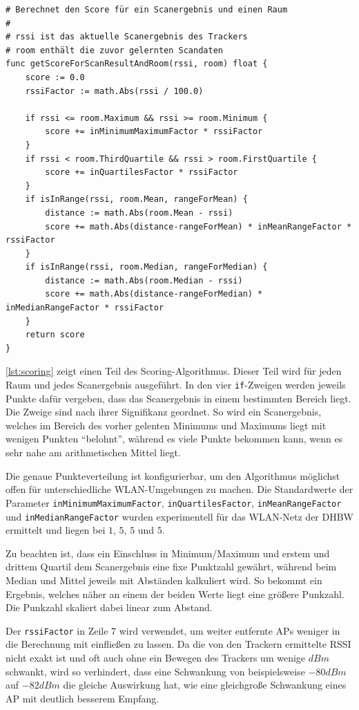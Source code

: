 \begin{lstlisting}[caption={Pseudocode-Beschreibung der Scoring-Funktion},label={lst:scoring},tabsize=2]
# Berechnet den Score für ein Scanergebnis und einen Raum
#
# rssi ist das aktuelle Scanergebnis des Trackers
# room enthält die zuvor gelernten Scandaten
func getScoreForScanResultAndRoom(rssi, room) float {
	score := 0.0
	rssiFactor := math.Abs(rssi / 100.0)

	if rssi <= room.Maximum && rssi >= room.Minimum {
		score += inMinimumMaximumFactor * rssiFactor
	}
	if rssi < room.ThirdQuartile && rssi > room.FirstQuartile {
		score += inQuartilesFactor * rssiFactor
	}
	if isInRange(rssi, room.Mean, rangeForMean) {
		distance := math.Abs(room.Mean - rssi)
		score += math.Abs(distance-rangeForMean) * inMeanRangeFactor * rssiFactor
	}
	if isInRange(rssi, room.Median, rangeForMedian) {
		distance := math.Abs(room.Median - rssi)
		score += math.Abs(distance-rangeForMedian) * inMedianRangeFactor * rssiFactor
	}
	return score
}
\end{lstlisting}

\autoref{lst:scoring} zeigt einen Teil des Scoring-Algorithmus. Dieser Teil wird für jeden Raum und
jedes Scanergebnis ausgeführt. In den vier \texttt{if}-Zweigen werden jeweils Punkte dafür vergeben,
dass das Scanergebnis in einem bestimmten Bereich liegt. Die Zweige sind nach ihrer Signifikanz
geordnet. So wird ein Scanergebnis, welches im Bereich des vorher gelenten Minimums und Maximums
liegt mit wenigen Punkten \enquote{belohnt}, während es viele Punkte bekommen kann, wenn es sehr
nahe am arithmetischen Mittel liegt.

Die genaue Punkteverteilung ist konfigurierbar, um den Algorithmus möglichst offen für
unterschiedliche \gls{WLAN}-Umgebungen zu machen. Die Standardwerte der Parameter
\texttt{inMinimumMaximumFactor}, \texttt{inQuartilesFactor}, \texttt{inMeanRangeFactor} und
\texttt{inMedianRangeFactor} wurden experimentell für das \gls{WLAN}-Netz der \gls{DHBW} ermittelt und liegen
bei $1$, $5$, $5$ und $5$.

Zu beachten ist, dass ein Einschluss in Minimum/Maximum und erstem und drittem Quartil dem
Scanergebnis eine fixe Punktzahl gewährt, während beim Median und Mittel jeweils mit Abständen
kalkuliert wird. So bekommt ein Ergebnis, welches näher an einem der beiden Werte liegt eine größere
Punkzahl. Die Punkzahl skaliert dabei linear zum Abstand.

Der \texttt{rssiFactor} in Zeile 7 wird verwendet, um weiter entfernte \glspl{AP} weniger in die
Berechnung mit einfließen zu lassen. Da die von den Trackern ermittelte \gls{RSSI} nicht exakt ist
und oft auch ohne ein Bewegen des Trackers um wenige $dBm$ schwankt, wird so verhindert, dass eine
Schwankung von beispielsweise $-80dBm$ auf $-82dBm$ die gleiche Auswirkung hat, wie eine gleichgroße
Schwankung eines \gls{AP} mit deutlich besserem Empfang.

